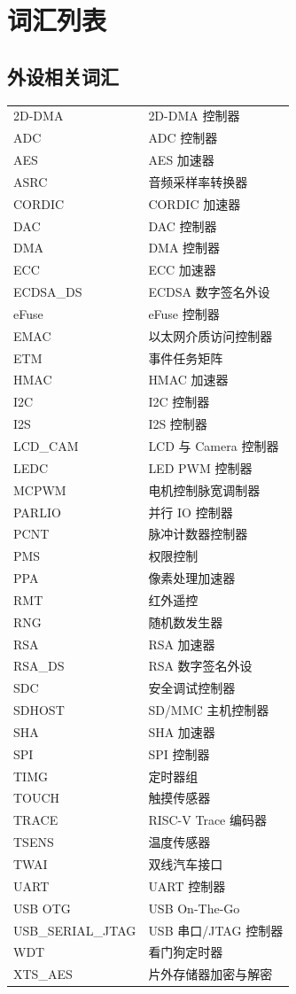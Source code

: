 \section*{词汇列表}\label{glossary}
\rhead{\Navigation}

\subsection*{外设相关词汇}

\begin{longtable}[c]{p{3cm}p{12cm} }

2D-DMA & 2D-DMA 控制器 \\
ADC & ADC 控制器 \\
AES & AES 加速器 \\
ASRC & 音频采样率转换器 \\
CORDIC & CORDIC 加速器 \\
DAC & DAC 控制器 \\ 
DMA & DMA 控制器 \\
ECC & ECC 加速器 \\
ECDSA\_DS & ECDSA 数字签名外设 \\
eFuse & eFuse 控制器 \\
EMAC & 以太网介质访问控制器 \\
ETM & 事件任务矩阵 \\
HMAC & HMAC 加速器 \\
I2C & I2C 控制器 \\
I2S & I2S 控制器 \\
LCD\_CAM & LCD 与 Camera 控制器 \\
LEDC & LED PWM 控制器 \\
MCPWM & 电机控制脉宽调制器 \\
PARLIO & 并行 IO 控制器 \\
PCNT & 脉冲计数器控制器 \\
PMS & 权限控制 \\
PPA & 像素处理加速器 \\
RMT & 红外遥控 \\
RNG & 随机数发生器 \\
RSA & RSA 加速器 \\
RSA\_DS & RSA 数字签名外设 \\
SDC & 安全调试控制器 \\
SDHOST & SD/MMC 主机控制器 \\
SHA & SHA 加速器 \\
SPI & SPI 控制器 \\
TIMG & 定时器组 \\
TOUCH & 触摸传感器 \\
TRACE & RISC-V Trace 编码器 \\
TSENS & 温度传感器 \\
TWAI & 双线汽车接口 \\
UART & UART 控制器 \\
USB OTG & USB On-The-Go \\
USB\_SERIAL\_JTAG & USB 串口/JTAG 控制器 \\
WDT & 看门狗定时器 \\
XTS\_AES & 片外存储器加密与解密 \\


\end{longtable}
